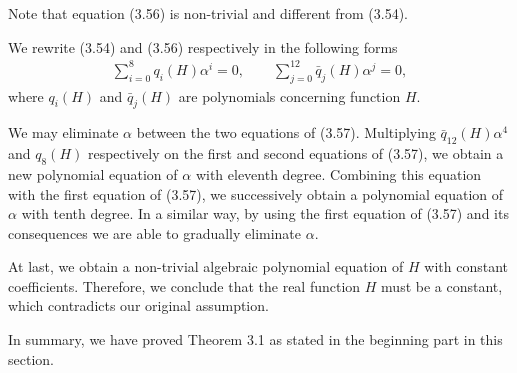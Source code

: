 \documentclass[twoside,reqno,A4]{amsart}
\theoremstyle{definition}
\theoremstyle{remark}
\numberwithin{equation}{section}
\begin{document}
Note that equation (3.56) is non-trivial and different from (3.54).

We rewrite (3.54) and (3.56) respectively in the following forms
\begin{eqnarray}
\sum_{i=0}^8q_i(H)\alpha^i=0,\qquad \sum_{j=0}^{12}{\bar
q}_j(H)\alpha^j=0,
\end{eqnarray}
where $q_i(H)$ and ${\bar q}_j(H)$ are polynomials concerning
function $H$.

We may eliminate $\alpha$ between the two equations of (3.57).
Multiplying ${\bar q}_{12}(H)\alpha^4$ and $q_8(H)$ respectively on
the first and second equations of (3.57), we obtain a new polynomial
equation of $\alpha$ with eleventh degree. Combining this equation
with the first equation of (3.57), we successively obtain a
polynomial equation of $\alpha$ with tenth degree. In a similar way,
by using the first equation of (3.57) and its consequences we are
able to gradually eliminate $\alpha$.

At last, we obtain a non-trivial algebraic polynomial equation of
$H$ with constant coefficients. Therefore, we conclude that the real
function $H$ must be a constant, which contradicts our original
assumption.


In summary, we have proved Theorem 3.1 as stated in the beginning
part in this section.
\end{document}
